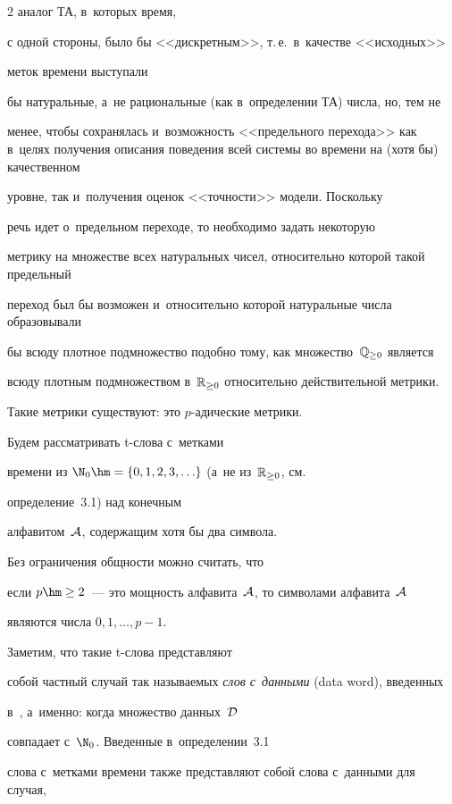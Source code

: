 \begin{multicols}{2}
аналог ТА, в~которых время,


с одной стороны, было бы <<дискретным>>, т.\,е.\  в~качестве <<исходных>> 


меток времени выступали


бы натуральные,  а~не рациональные (как в~определении ТА) числа, но, тем не


менее, чтобы сохранялась и~возможность <<предельного перехода>>  как в~целях получения описания поведения всей системы во времени на (хотя бы) качественном


уровне, так и~получения оценок  <<точности>> модели.  Поскольку


речь идет о~предельном переходе, то необходимо задать некоторую


метрику на множестве всех натуральных чисел, относительно которой такой предельный


переход был бы возможен и~относительно которой натуральные числа образовывали


бы всюду плотное подмножество подобно тому, как множество~$\mathbb{Q}_{\ge 0}$ является


всюду плотным подмножеством в~$\mathbb{R}_{\ge 0}$ относительно действительной мет\-ри\-ки.


Такие метрики существуют: это $p$-ади\-че\-ские мет\-рики.





Будем рассматривать t-сло\-ва  с~метками


времени из $\N_0\hm=\{0,1,2,3,\ldots\}$ (а~не из~$\mathbb{R}_{\ge 0}$, см.\


 определение~3.1) над конечным


алфавитом~$\mathcal A$, содержащим хотя бы два символа.


Без ограничения общности можно считать, что


если $p\hm\ge 2$~---  это мощность алфавита~$\mathcal A$, то  символами алфавита~$\mathcal A$ 


являются числа $0,1,\ldots,p-1$.


Заметим, что такие  t-сло\-ва  пред\-став\-ля\-ют


собой част\-ный случай так на\-зы\-ва\-емых \textit{слов с~данными} (data word), введенных 


в~\cite{Bouyer-Algebraic-Time}, а~именно: когда множество данных~$\mathcal D$


совпадает с~$\N_0$. Введенные в~определении~3.1


слова с~метками времени также пред\-став\-ля\-ют собой слова с~данными для случая,



\end{multicols}
